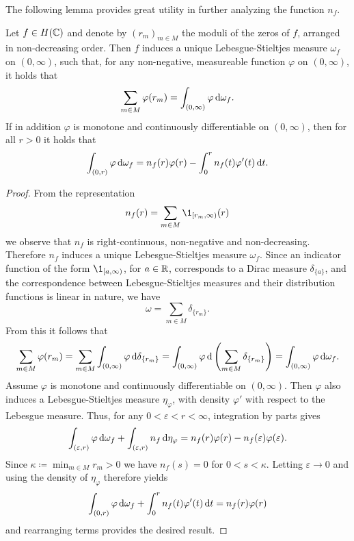 The following lemma provides great utility in further analyzing the function $n_f$.

\begin{lemma} \label{lem:zeros-measure}
    Let $f \in H(\mathbb{C})$ and denote by $(r_m)_{m \in M}$ the moduli of the zeros of $f$, arranged in non-decreasing order. Then $f$ induces a unique Lebesgue-Stieltjes measure $\omega_f$ on $(0, \infty)$, such that, for any non-negative, measureable function $\varphi$ on $(0, \infty)$, it holds that
    \begin{equation*}
        \sum_{m \in M} \varphi(r_m) = \int_{(0, \infty)} \varphi \mathop{}\!\mathrm{d} \omega_f.
    \end{equation*}
    If in addition $\varphi$ is monotone and continuously differentiable on $(0, \infty)$, then for all $r > 0$ it holds that
    \begin{equation*}
        \int_{(0, r)} \varphi \mathop{}\!\mathrm{d} \omega_f = n_f(r) \varphi(r) - \int_0^r n_f(t) \varphi'(t) \mathop{}\!\mathrm{d} t.
    \end{equation*}
\end{lemma}

\begin{proof}
    From the representation
    $$ n_f(r) = \sum_{m \in M} \1_{[r_m, \infty)}(r) $$
    we observe that $n_f$ is right-continuous, non-negative and non-decreasing. Therefore $n_f$ induces a unique Lebesgue-Stieltjes measure $\omega_f$. Since an indicator function of the form $\1_{[a, \infty)}$, for $a \in \mathbb{R}$, corresponds to a Dirac measure $\delta_{\{ a \}}$, and the correspondence between Lebesgue-Stieltjes measures and their distribution functions is linear in nature, we have
    $$ \omega = \sum_{m \in M} \delta_{\{r_m\}}. $$
    From this it follows that
    \begin{equation*}
        \sum_{m \in M} \varphi(r_m) = \sum_{m \in M} \int_{(0, \infty)} \varphi \mathop{}\!\mathrm{d} \delta_{\{r_m\}} = \int_{(0, \infty)} \varphi \mathop{}\!\mathrm{d} \left( \sum_{m \in M} \delta_{\{r_m\}} \right) = \int_{(0, \infty)} \varphi \mathop{}\!\mathrm{d} \omega_f.
    \end{equation*}
    Assume $\varphi$ is monotone and continuously differentiable on $(0, \infty)$. Then $\varphi$ also induces a Lebesgue-Stieltjes measure $\eta_\varphi$, with density $\varphi'$ with respect to the Lebesgue measure. Thus, for any $0 < \varepsilon < r < \infty$, integration by parts gives
    \begin{equation*}
        \int_{(\varepsilon, r)} \varphi \mathop{}\!\mathrm{d} \omega_f + \int_{(\varepsilon, r)} n_f \mathop{}\!\mathrm{d} \eta_\varphi = n_f(r) \varphi(r) - n_f(\varepsilon) \varphi(\varepsilon).
    \end{equation*}
    Since $\kappa \coloneqq \min_{m \in M} r_m > 0$ we have $n_f(s) = 0$ for $0 < s < \kappa$. Letting $\varepsilon \to 0$ and using the density of $\eta_\varphi$ therefore yields
    \begin{equation*}
        \int_{(0, r)} \varphi \mathop{}\!\mathrm{d} \omega_f + \int_0^r n_f(t) \varphi'(t) \mathop{}\!\mathrm{d} t = n_f(r) \varphi(r)
    \end{equation*}
    and rearranging terms provides the desired result.
\end{proof}

